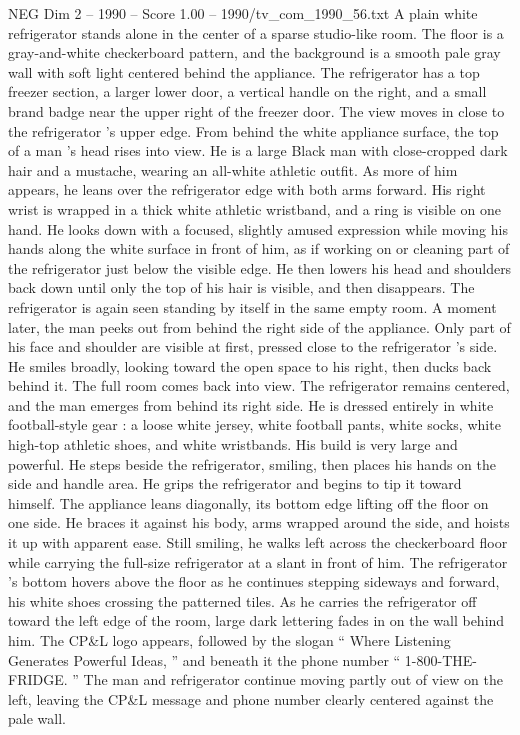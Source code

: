 \begin{textsample}{NEG Dim 2 – 1990 – Score 1.00 – 1990/tv\_com\_1990\_56.txt}  \label{ex:f2_neg_066}
A plain white refrigerator stands alone in the center of a sparse studio-like room.
The floor is a gray-and-white checkerboard pattern, and the background is a smooth pale gray wall with soft light centered behind the appliance.
The refrigerator has a top freezer section, a larger lower door, a vertical handle on the right, and a small brand badge near the upper right of the freezer door.
The view moves in close to the refrigerator ’s upper edge.
From behind the white appliance surface, the top of a man ’s head rises into view.
He is a large Black man with close-cropped dark hair and a mustache, wearing an all-white athletic outfit.
As more of him appears, he leans over the refrigerator edge with both arms forward.
His right wrist is wrapped in a thick white athletic wristband, and a ring is visible on one hand.
He looks down with a focused, slightly amused expression while moving his hands along the white surface in front of him, as if working on or cleaning part of the refrigerator just below the visible edge.
He then lowers his head and shoulders back down until only the top of his hair is visible, and then disappears.
The refrigerator is again seen standing by itself in the same empty room.
A moment later, the man peeks out from behind the right side of the appliance.
Only part of his face and shoulder are visible at first, pressed close to the refrigerator ’s side.
He smiles broadly, looking toward the open space to his right, then ducks back behind it.
The full room comes back into view.
The refrigerator remains centered, and the man emerges from behind its right side.
He is dressed entirely in white football-style gear : a loose white jersey, white football pants, white socks, white high-top athletic shoes, and white wristbands.
His build is very large and powerful.
He steps beside the refrigerator, smiling, then places his hands on the side and handle area.
He grips the refrigerator and begins to tip it toward himself.
The appliance leans diagonally, its bottom edge lifting off the floor on one side.
He braces it against his body, arms wrapped around the side, and hoists it up with apparent ease.
Still smiling, he walks left across the checkerboard floor while carrying the full-size refrigerator at a slant in front of him.
The refrigerator ’s bottom hovers above the floor as he continues stepping sideways and forward, his white shoes crossing the patterned tiles.
As he carries the refrigerator off toward the left edge of the room, large dark lettering fades in on the wall behind him.
The CP\&L logo appears, followed by the slogan “ Where Listening Generates Powerful Ideas, ” and beneath it the phone number “ 1-800-THE-FRIDGE. ” The man and refrigerator continue moving partly out of view on the left, leaving the CP\&L message and phone number clearly centered against the pale wall.

\end{textsample}

